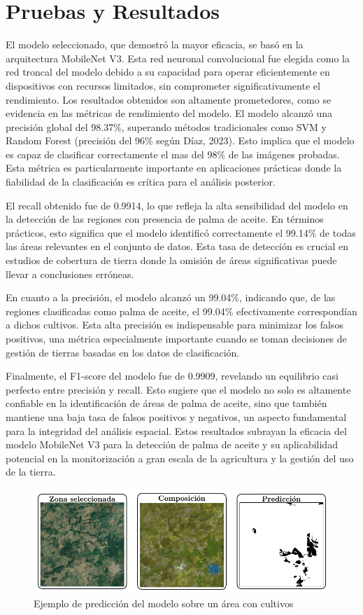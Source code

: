 \section{Pruebas y Resultados}
El modelo seleccionado, que demostró la mayor eficacia, se basó en la arquitectura MobileNet V3. Esta red neuronal convolucional fue elegida como la red troncal del modelo debido a su capacidad para operar eficientemente en dispositivos con recursos limitados, sin comprometer significativamente el rendimiento. Los resultados obtenidos son altamente prometedores, como se evidencia en las métricas de rendimiento del modelo.  El modelo alcanzó una precisión global del 98.37\%, superando métodos tradicionales como SVM y Random Forest (precisión del 96\% según Díaz, 2023). Esto implica que el modelo es capaz de clasificar correctamente el mas del 98\% de las imágenes probadas. Esta métrica es particularmente importante en aplicaciones prácticas donde la fiabilidad de la clasificación es crítica para el análisis posterior.

El recall obtenido fue de 0.9914, lo que refleja la alta sensibilidad del modelo en la detección de las regiones con presencia de palma de aceite. En términos prácticos, esto significa que el modelo identificó correctamente el 99.14\% de todas las áreas relevantes en el conjunto de datos. Esta tasa de detección es crucial en estudios de cobertura de tierra donde la omisión de áreas significativas puede llevar a conclusiones erróneas.

En cuanto a la precisión, el modelo alcanzó un 99.04\%, indicando que, de las regiones clasificadas como palma de aceite, el 99.04\% efectivamente correspondían a dichos cultivos. Esta alta precisión es indispensable para minimizar los falsos positivos, una métrica especialmente importante cuando se toman decisiones de gestión de tierras basadas en los datos de clasificación.

Finalmente, el F1-score del modelo fue de 0.9909, revelando un equilibrio casi perfecto entre precisión y recall. Esto sugiere que el modelo no solo es altamente confiable en la identificación de áreas de palma de aceite, sino que también mantiene una baja tasa de falsos positivos y negativos, un aspecto fundamental para la integridad del análisis espacial. Estos resultados subrayan la eficacia del modelo MobileNet V3 para la detección de palma de aceite y su aplicabilidad potencial en la monitorización a gran escala de la agricultura y la gestión del uso de la tierra.

\begin{figure}[t]
 \centering
 \includegraphics[width=\textwidth]{example_selected_zone}
 \caption{Ejemplo de predicción del modelo sobre un área con cultivos}
 \label{fig:example_selected_zone}
\end{figure}

